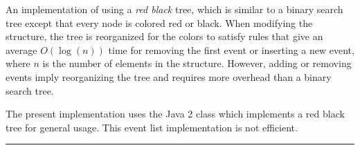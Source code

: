 
An implementation of  using a \emph{red black} tree,
which is similar to a binary search tree except that
every node is colored red or black.  When modifying the structure,
the tree is reorganized for the colors to satisfy rules that
give an average $O(\log (n))$ time for removing the first event
or inserting a new event,
where $n$ is the number of elements in the structure.
However, adding or removing events imply reorganizing
the tree and requires more overhead than a binary search tree.

The present implementation uses the Java 2
 class
which implements a red black tree for general usage.
This event list implementation is not efficient.

\bigskip\hrule

